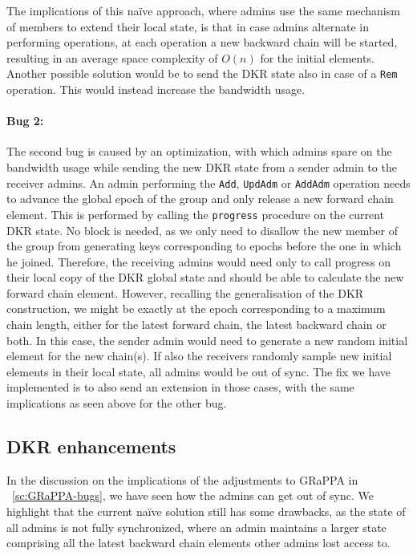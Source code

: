 The implications of this na\"ive approach, where admins use the same
mechanism of members to extend their local state, is that in case admins
alternate in performing operations, at each operation a new backward chain
will be started, resulting in an average space complexity of $O(n)$ 
for the initial elements.
Another possible solution would be to send the DKR state also
in case of a \texttt{Rem} operation. This would instead 
increase the bandwidth usage.

\paragraph{Bug 2:} The second bug is caused by an optimization,
with which admins spare on the bandwidth usage while sending the new DKR state
from a sender admin to the receiver admins.
An admin performing the \texttt{Add}, \texttt{UpdAdm} or \texttt{AddAdm}
operation needs to advance the global
epoch of the group and only release a new forward chain element.
This is performed by calling the \texttt{progress} procedure on the current
DKR state. No block is needed, as we only need to disallow
the new member of the group from generating keys corresponding
to epochs before the one in which he joined. Therefore, the receiving
admins would need only to call progress on their local copy of the DKR
global state and should be able to calculate the new forward chain element.
However, recalling the generalisation of the DKR construction,
we might be exactly at the epoch corresponding to a maximum chain length,
either for the latest forward chain, the latest backward chain or both.
In this case, the sender admin would need to generate a new random initial 
element for the new chain(s). If also the receivers randomly sample new 
initial elements in their local state, all admins would be out of sync.
The fix we have implemented is to also send an extension in those cases,
with the same implications as seen above for the other bug.


\subsection{DKR enhancements}\label{sc:DKR-enhancements}

In the discussion on the implications of the adjustments to GRaPPA in ~\cref{sc:GRaPPA-bugs},
we have seen how the admins can get out of sync.
We highlight that the current na\"ive solution still
has some drawbacks, as the state of all admins is not
fully synchronized, where an admin maintains a larger state
comprising all the latest backward chain elements other admins
lost access to.

